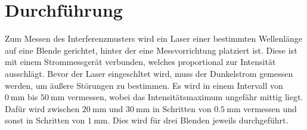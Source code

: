 \section{Durchführung}
Zum Messen des Interferenzmusters wird ein Laser einer bestimmten Wellenlänge auf eine Blende gerichtet, hinter der
eine Messvorrichtung platziert ist. Diese ist mit einem Strommessgerät verbunden, welches proportional zur Intensität
ausschlägt. Bevor der Laser eingeschltet wird, muss der Dunkelstrom gemessen werden, um äußere Störungen zu bestimmen.
Es wird in einem Intervall von $\qty{0}{\milli\meter}$ bis $\qty{50}{\milli\meter}$ vermessen, wobei das 
Intensitätsmaximum ungefähr mittig liegt. Dafür wird zwischen $\qty{20}{\milli\meter}$ und $\qty{30}{\milli\meter}$ in
Schritten von $\qty{0.5}{\milli\meter}$ vermessen und sonst in Schritten von $\qty{1}{\milli\meter}$. Dies wird für 
drei Blenden jeweils durchgeführt.
\label{sec:Durchführung}
